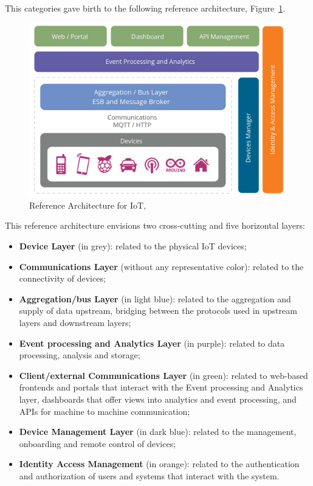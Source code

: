 This categories gave birth to the following reference architecture, Figure~\ref{fig:stateofart:arch:wso2:ra}.

\begin{figure}[H]
    \centering
    \includegraphics[scale=0.4]{assets/figures/wso2-ira.png}
    \caption[WSO2 Reference Architecture for IoT]{Reference Architecture for IoT, \cite{wso2ira}}
    \label{fig:stateofart:arch:wso2:ra}
\end{figure}

This reference architecture envisions two cross-cutting and five horizontal layers:

\begin{itemize}
    \item \textbf{Device Layer} (in grey): related to the physical \gls{IoT} devices;
    \item \textbf{Communications Layer} (without any representative color): related to the connectivity of devices;
    \item \textbf{Aggregation/bus Layer} (in light blue): related to the aggregation and supply of data upstream, bridging between the protocols used in upstream layers and downstream layers; 
    \item \textbf{Event processing and Analytics Layer} (in purple): related to data processing, analysis and storage;
    \item \textbf{Client/external Communications Layer} (in green): related to web-based frontends and portals that interact with the Event processing and Analytics layer, dashboards that
    offer views into analytics and event processing, and \gls{API}s for machine to machine communication;
    \item \textbf{Device Management Layer} (in dark blue): related to the management, onboarding and remote control of devices;
    \item \textbf{Identity Access Management} (in orange): related to the authentication and authorization of users and systems that interact with the system.
\end{itemize}

